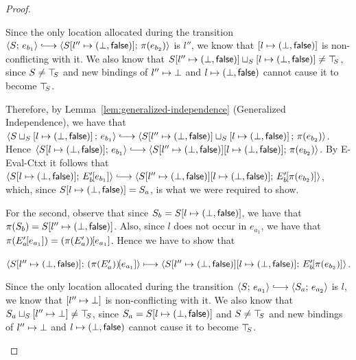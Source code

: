 \begin{proof}
\begin{enumerate}
\begin{enumerate}
\begin{itemize}
          Since the only location allocated during the transition
          $\config{S}{e_{b_1}} \parstepsto
          \config{\extS{S}{l''}{\bot}{\frozenfalse}}{\pi(e_{b_2})}$ is $l''$, we
          know that $\left[ l \mapsto (\bot, \textsf{false}) \right]$ is
          non-conflicting with it.  We also know that
          $S[l'' \mapsto (\bot, \textsf{false})] \sqcup_{S} \left[ l \mapsto (\bot, \textsf{false}) \right]
          \neq \top\hspace{-0.85mm}_{S}$, since $S \neq \top\hspace{-0.85mm}_{S}$ and new bindings of
          $l'' \mapsto \bot$ and
          $l \mapsto (\bot, \textsf{false})$ cannot cause it to become
          $\top\hspace{-0.85mm}_{S}$.


          Therefore, by Lemma~\ref{lem:generalized-independence}
          (Generalized Independence), we have that
          $\config{\lubstore{S}{\store{\storebinding{l}{\bot}{\frozenfalse}}}}{e_{b_1}}
          \parstepsto
          \config{\lubstore{\extS{S}{l''}{\bot}{\frozenfalse}}{\store{\storebinding{l}{\bot}{\frozenfalse}}}}{\pi(e_{b_2})}$.
          Hence $\config{\extS{S}{l}{\bot}{\frozenfalse}}{e_{b_1}}
          \parstepsto
          \config{\extS{\extS{S}{l''}{\bot}{\frozenfalse}}{l}{\bot}{\frozenfalse}}{\pi(e_{b_2})}$.
          By {\sc E-Eval-Ctxt} it follows that
          $\config{\extS{S}{l}{\bot}{\frozenfalse}}{\evalctxt{E'_b}{e_{b_1}}}
          \parstepsto
          \config{\extS{\extS{S}{l''}{\bot}{\frozenfalse}}{l}{\bot}{\frozenfalse}}{\evalctxt{E'_b}{\pi(e_{b_2})}}$,
          which, since $S[l \mapsto (\bot, \textsf{false})] = S_a$, is
          what we were required to show.

          For the second, observe that since $S_b =
          S[l \mapsto (\bot, \textsf{false})]$, we have that $\pi(S_b) =
          S[l'' \mapsto (\bot, \textsf{false})]$.  Also, since $l$ does not occur in
          $e_{a_1}$, we have that $\pi(E'_a\hspace{-1mm}\left[e_{a_1}\right]) =
          (\pi(E'_a))\hspace{-1mm}\left[e_{a_1}\right]$.  Hence we have to show that

          $\langle S[l'' \mapsto (\bot, \textsf{false})];\, (\pi(E'_a))\hspace{-1mm}\left[e_{a_1}\right] \rangle
          \longmapsto
          \langle S[l'' \mapsto (\bot, \textsf{false})][l \mapsto (\bot, \textsf{false})];\, E'_b\hspace{-1mm}\left[\pi(e_{b_2})\right] \rangle$.

          Since the only location allocated during the transition
          $\config{S}{e_{a_1}} \parstepsto \config{S_a}{e_{a_2}}$ is
          $l$, we know that $\left[ l'' \mapsto \bot \right]$ is
          non-conflicting with it.  We also know that
          $S_a \sqcup_{S} \left[ l'' \mapsto \bot \right] \neq
          \top\hspace{-0.85mm}_{S}$, since $S_a = S[l \mapsto (\bot, \textsf{false})]$ and $S \neq
          \top\hspace{-0.85mm}_{S}$ and new bindings of $l'' \mapsto \bot$ and
          $l \mapsto (\bot, \textsf{false})$ cannot cause it to become
          $\top\hspace{-0.85mm}_{S}$.


\end{itemize}
\end{enumerate}
\end{enumerate}
\end{proof}
